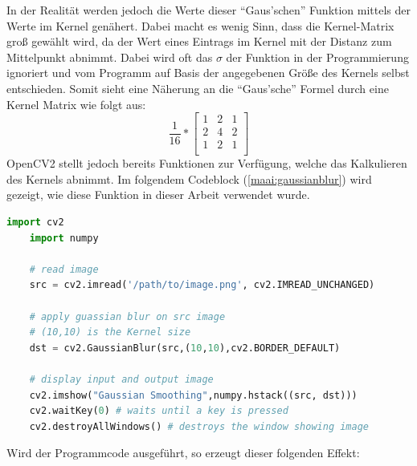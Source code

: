In der Realität werden jedoch die Werte dieser ``Gaus'schen'' Funktion mittels der Werte im Kernel genähert. Dabei macht es wenig Sinn, dass die Kernel-Matrix groß gewählt wird, da der Wert eines Eintrags im Kernel mit der Distanz zum Mittelpunkt abnimmt. Dabei wird oft das \(\sigma\) der Funktion in der Programmierung ignoriert und vom Programm auf Basis der angegebenen Größe des Kernels selbst entschieden. Somit sieht eine Näherung an die ``Gaus'sche'' Formel durch eine Kernel Matrix wie folgt aus:
\[
  \frac{ 1 }{ 16 } * \left[\begin{array}{rrr}
      1 & 2 & 1 \\
      2 & 4 & 2 \\
      1 & 2 & 1 \\
    \end{array}\right]
\]
OpenCV2 stellt jedoch bereits Funktionen zur Verfügung, welche das Kalkulieren des Kernels abnimmt. Im folgendem Codeblock (\ref{maai:gaussianblur}) wird gezeigt, wie diese Funktion in dieser Arbeit verwendet wurde.


\begin{lstlisting}[caption=Gaussian Blur,language=Python,label=maai:gaussianblur]
    import cv2
    import numpy
    
    # read image
    src = cv2.imread('/path/to/image.png', cv2.IMREAD_UNCHANGED)
    
    # apply guassian blur on src image
    # (10,10) is the Kernel size
    dst = cv2.GaussianBlur(src,(10,10),cv2.BORDER_DEFAULT)
    
    # display input and output image
    cv2.imshow("Gaussian Smoothing",numpy.hstack((src, dst)))
    cv2.waitKey(0) # waits until a key is pressed
    cv2.destroyAllWindows() # destroys the window showing image
\end{lstlisting}


Wird der Programmcode ausgeführt, so erzeugt dieser folgenden Effekt:

